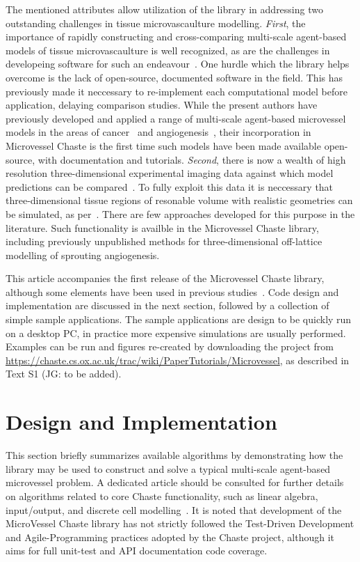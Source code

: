 \documentclass[10pt,letterpaper]{article}
\begin{document}
The mentioned attributes allow utilization of the library in addressing two outstanding challenges in tissue microvascaulture modelling. \emph{First}, the importance of rapidly constructing and cross-comparing multi-scale agent-based models of tissue microvascaulture is well recognized, as are the challenges in developeing software for such an endeavour~\cite{Rieger2015, Connor2012}. One hurdle which the library helps overcome is the lack of open-source, documented software in the field. This has previously made it neccessary to re-implement each computational model before application, delaying comparison studies. While the present authors have previously developed and applied a range of multi-scale agent-based microvessel models in the areas of cancer~\cite{Alarcon2005, Perfahl2011} and angiogenesis~\cite{Connor2015}, their incorporation in Microvessel Chaste is the first time such models have been made available open-source, with documentation and tutorials. \emph{Second}, there is now a wealth of high resolution three-dimensional experimental imaging data against which model predictions can be compared~\cite{Tozer2004}. To fully exploit this data it is neccessary that three-dimensional tissue regions of resonable volume with realistic geometries can be simulated, as per~\cite{Grogan2016}. There are few approaches developed for this purpose in the literature. Such functionality is availble in the Microvessel Chaste library, including previously unpublished methods for three-dimensional off-lattice modelling of sprouting angiogenesis.  

This article accompanies the first release of the Microvessel Chaste library, although some elements have been used in previous studies~\cite{Connor2015, Grogan2016}. Code design and implementation are discussed in the next section, followed by a collection of simple sample applications. The sample applications are design to be quickly run on a desktop PC, in practice more expensive simulations are usually performed. Examples can be run and figures re-created by downloading the project from \url{https://chaste.cs.ox.ac.uk/trac/wiki/PaperTutorials/Microvessel}, as described in Text S1 (JG: to be added). 

\section*{Design and Implementation}

This section briefly summarizes available algorithms by demonstrating how the library may be used to construct and solve a typical multi-scale agent-based microvessel problem. A dedicated article should be consulted for further details on algorithms related to core Chaste functionality, such as linear algebra, input/output, and discrete cell modelling~\cite{Mirams2013}. It is noted that development of the MicroVessel Chaste library has not strictly followed the Test-Driven Development and Agile-Programming practices adopted by the Chaste project, although it aims for full unit-test and API documentation code coverage.
\end{document}
